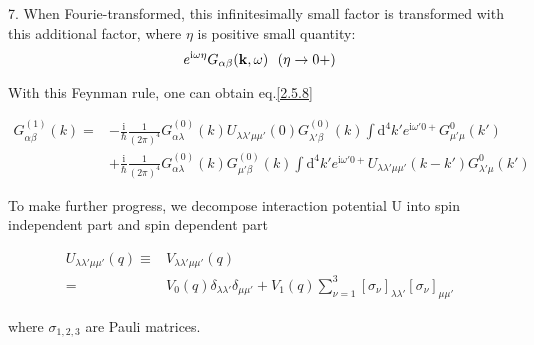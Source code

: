 7. When Fourie-transformed, this infinitesimally small factor is transformed with this additional factor, where $\eta$ is positive small quantity:
$$e^{\mathrm{i}\omega\eta}G_{\alpha\beta}({\bf k},\omega) \ \ (\eta\rightarrow0+)$$

With this Feynman rule, one can obtain eq.\eqref{2.5.8}

\begin{align}
G_{\alpha\beta}^{(1)}(k)=&-\frac{\mathrm{i}}{\hbar}\frac{1}{(2\pi)^4} G_{\alpha\lambda}^{(0)}(k)U_{\lambda\lambda'\mu\mu'}(0)G_{\lambda'\beta}^{(0)}(k)\int \mathrm{d}^4k'e^{\mathrm{i}\omega'0+}G_{\mu'\mu}^0(k') \nonumber \\
&+\frac{\mathrm{i}}{\hbar}\frac{1}{(2\pi)^4} G_{\alpha\lambda}^{(0)}(k)G_{\mu'\beta}^{(0)}(k)\int \mathrm{d}^4k'e^{\mathrm{i}\omega'0+}U_{\lambda\lambda'\mu\mu'}(k-k')G_{\lambda'\mu}^0(k') \nonumber
\end{align}

To make further progress, we decompose interaction potential U into spin independent part and spin dependent part 

\begin{align}
U_{\lambda\lambda'\mu\mu'}(q)\equiv& V_{\lambda\lambda'\mu\mu'}(q) \nonumber \\
=& V_0(q) \delta_{\lambda\lambda'}\delta_{\mu\mu'}+V_1(q)\sum_{\nu=1}^{3}[\sigma_{\nu}]_{\lambda\lambda'}[\sigma_{\nu}]_{\mu\mu'} \nonumber
\end{align}

where $\sigma_{1,2,3}$ are Pauli matrices.

